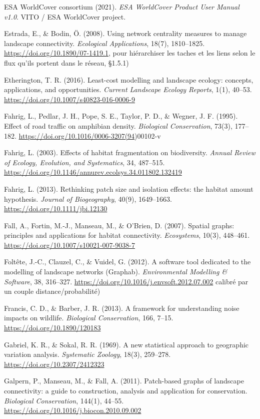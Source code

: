 \documentclass[a4paper,11pt]{report}
\begin{document}
ESA WorldCover consortium (2021). \textit{ESA WorldCover Product User Manual v1.0}. VITO / ESA WorldCover project.

Estrada, E., \& Bodin, Ö. (2008). Using network centrality measures to manage landscape connectivity. \textit{Ecological Applications}, 18(7), 1810--1825. \url{https://doi.org/10.1890/07-1419.1,} pour hiérarchiser les taches et les liens selon le flux qu'ils portent dans le réseau, §1.5.1)

Etherington, T. R. (2016). Least-cost modelling and landscape ecology: concepts, applications, and opportunities. \textit{Current Landscape Ecology Reports}, 1(1), 40--53. \url{https://doi.org/10.1007/s40823-016-0006-9}

Fahrig, L., Pedlar, J. H., Pope, S. E., Taylor, P. D., \& Wegner, J. F. (1995). Effect of road traffic on amphibian density. \textit{Biological Conservation}, 73(3), 177--182. \url{https://doi.org/10.1016/0006-3207(94})00102-v

Fahrig, L. (2003). Effects of habitat fragmentation on biodiversity. \textit{Annual Review of Ecology, Evolution, and Systematics}, 34, 487--515. \url{https://doi.org/10.1146/annurev.ecolsys.34.011802.132419}

Fahrig, L. (2013). Rethinking patch size and isolation effects: the habitat amount hypothesis. \textit{Journal of Biogeography}, 40(9), 1649--1663. \url{https://doi.org/10.1111/jbi.12130}

Fall, A., Fortin, M.-J., Manseau, M., \& O'Brien, D. (2007). Spatial graphs: principles and applications for habitat connectivity. \textit{Ecosystems}, 10(3), 448--461. \url{https://doi.org/10.1007/s10021-007-9038-7}

Foltête, J.-C., Clauzel, C., \& Vuidel, G. (2012). A software tool dedicated to the modelling of landscape networks (Graphab). \textit{Environmental Modelling \& Software}, 38, 316--327. \url{https://doi.org/10.1016/j.envsoft.2012.07.002} calibré par un couple distance/probabilité)

Francis, C. D., \& Barber, J. R. (2013). A framework for understanding noise impacts on wildlife. \textit{Biological Conservation}, 166, 7--15. \url{https://doi.org/10.1890/120183}

Gabriel, K. R., \& Sokal, R. R. (1969). A new statistical approach to geographic variation analysis. \textit{Systematic Zoology}, 18(3), 259--278. \url{https://doi.org/10.2307/2412323}

Galpern, P., Manseau, M., \& Fall, A. (2011). Patch-based graphs of landscape connectivity: a guide to construction, analysis and application for conservation. \textit{Biological Conservation}, 144(1), 44--55. \url{https://doi.org/10.1016/j.biocon.2010.09.002}
\end{document}
